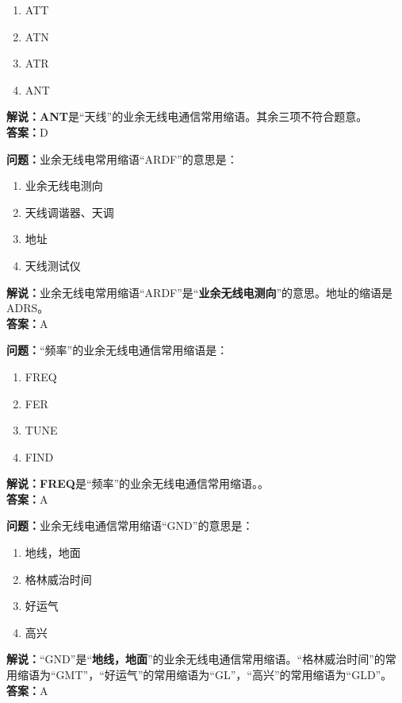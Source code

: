 \begin{enumerate}[label=\Alph*), leftmargin=1.5cm]
	\item ATT
	\item ATN
	\item ATR
	\item ANT
\end{enumerate}

\textbf{解说：}\textbf{ANT}是“天线”的业余无线电通信常用缩语。其余三项不符合题意。\\\textbf{答案：}D



\textbf{问题：}业余无线电常用缩语“ARDF”的意思是：

\begin{enumerate}[label=\Alph*), leftmargin=1.5cm]
	\item 业余无线电测向
	\item 天线调谐器、天调
	\item 地址
	\item 天线测试仪
\end{enumerate}

\textbf{解说：}业余无线电常用缩语“ARDF”是“\textbf{业余无线电测向}”的意思。地址的缩语是ADRS。\\\textbf{答案：}A



\textbf{问题：}“频率”的业余无线电通信常用缩语是：
\begin{enumerate}[label=\Alph*), leftmargin=1.5cm]
	\item FREQ
	\item FER
	\item TUNE
	\item FIND
\end{enumerate}

\textbf{解说：}\textbf{FREQ}是“频率”的业余无线电通信常用缩语。。\\\textbf{答案：}A



\textbf{问题：}业余无线电通信常用缩语“GND”的意思是：

\begin{enumerate}[label=\Alph*), leftmargin=1.5cm]
	\item 地线，地面
	\item 格林威治时间
	\item 好运气
	\item 高兴
\end{enumerate}

\textbf{解说：}“GND”是“\textbf{地线，地面}”的业余无线电通信常用缩语。“格林威治时间”的常用缩语为“GMT”，“好运气”的常用缩语为“GL”，“高兴”的常用缩语为“GLD”。\\\textbf{答案：}A



